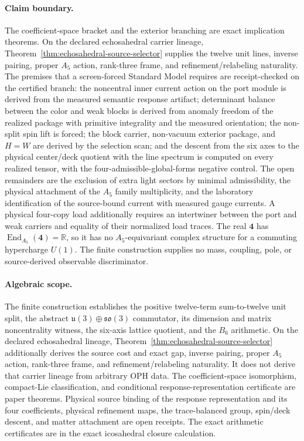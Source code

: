 \documentclass[11pt]{article}
\begin{document}
\paragraph{Claim boundary.} The coefficient-space bracket and the
exterior branching are exact implication theorems. On the declared
echosahedral carrier lineage, Theorem~\ref{thm:echosahedral-source-selector}
supplies the twelve unit lines, inverse pairing, proper \(A_5\) action,
rank-three frame, and refinement/relabeling naturality. The premises that a
screen-forced Standard Model requires are receipt-checked on the certified
branch: the noncentral inner current action on the port module is derived
from the measured semantic response artifact; determinant balance between
the color and weak blocks is derived from anomaly freedom of the realized
package with primitive integrality and the measured orientation; the
non-split spin lift is forced; the block carrier, non-vacuum exterior
package, and \(H=W\) are derived by the selection scan; and the descent from
the six axes to the physical center/deck quotient with the line spectrum is
computed on every realized tensor, with the four-admissible-global-forms
negative control. The open remainders are the exclusion of
extra light sectors by minimal admissibility, the physical attachment of the
\(A_5\) family multiplicity, and the laboratory identification of the
source-bound current with measured gauge currents. A physical
four-copy load additionally requires an intertwiner between the port and weak
carriers and equality of their normalized load traces. The real \(\mathbf4\) has
\(\operatorname{End}_{A_5}(\mathbf4)=\mathbb R\), so it has no
\(A_5\)-equivariant complex structure for a commuting hypercharge \(U(1)\).
The finite construction supplies no mass, coupling, pole, or source-derived
observable discriminator.

\paragraph{Algebraic scope.} The finite construction establishes the positive twelve-term
sum-to-twelve unit split, the abstract
\(\mathfrak u(3)\oplus\mathfrak{so}(3)\) commutator, its dimension and matrix
noncentrality witness, the six-axis lattice quotient, and the \(B_6\)
arithmetic. On the declared echosahedral lineage,
Theorem~\ref{thm:echosahedral-source-selector} additionally derives the source
cost and exact gap, inverse pairing, proper \(A_5\) action, rank-three frame,
and refinement/relabeling naturality. It does not derive that carrier lineage
from arbitrary OPH data. The coefficient-space isomorphism, compact-Lie
classification, and conditional response-representation certificate are paper
theorems. Physical source binding of the response representation and its four
coefficients, physical refinement maps, the trace-balanced group, spin/deck
descent, and matter attachment are open receipts. The exact arithmetic certificates are in
the exact icosahedral closure calculation.
\end{document}
